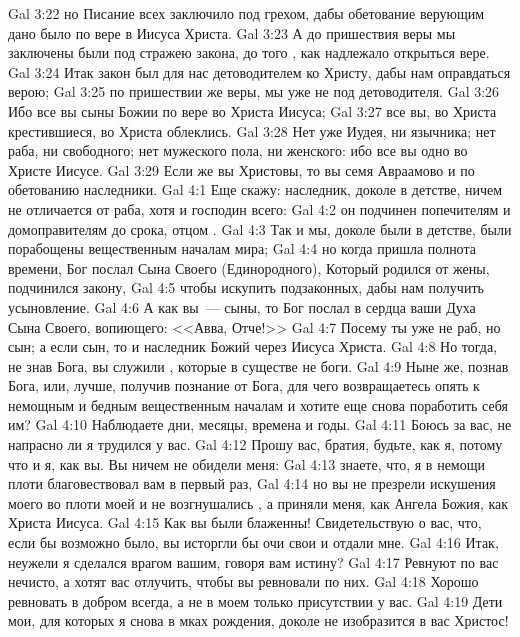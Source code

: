 \vs Gal 3:22 но Писание всех заключило под грехом, дабы обетование верующим дано было по вере в Иисуса Христа.
\vs Gal 3:23 А до пришествия веры мы заключены были под стражею закона, до того , как надлежало открыться вере.
\vs Gal 3:24 Итак закон был для нас детоводителем ко Христу, дабы нам оправдаться верою;
\vs Gal 3:25 по пришествии же веры, мы уже не под  детоводителя.
\vs Gal 3:26 Ибо все вы сыны Божии по вере во Христа Иисуса;
\vs Gal 3:27 все вы, во Христа крестившиеся, во Христа облеклись.
\vs Gal 3:28 Нет уже Иудея, ни язычника; нет раба, ни свободного; нет мужеского пола, ни женского: ибо все вы одно во Христе Иисусе.
\vs Gal 3:29 Если же вы Христовы, то вы семя Авраамово и по обетованию наследники.
\vs Gal 4:1 Еще скажу: наследник, доколе в детстве, ничем не отличается от раба, хотя и господин всего:
\vs Gal 4:2 он подчинен попечителям и домоправителям до срока, отцом .
\vs Gal 4:3 Так и мы, доколе были в детстве, были порабощены вещественным началам мира;
\vs Gal 4:4 но когда пришла полнота времени, Бог послал Сына Своего (Единородного), Который родился от жены, подчинился закону,
\vs Gal 4:5 чтобы искупить подзаконных, дабы нам получить усыновление.
\vs Gal 4:6 А как вы~--- сыны, то Бог послал в сердца ваши Духа Сына Своего, вопиющего: <<Авва, Отче!>>
\vs Gal 4:7 Посему ты уже не раб, но сын; а если сын, то и наследник Божий через Иисуса Христа.
\vs Gal 4:8 Но тогда, не знав Бога, вы служили , которые в существе не боги.
\vs Gal 4:9 Ныне же, познав Бога, или, лучше, получив познание от Бога, для чего возвращаетесь опять к немощным и бедным вещественным началам и хотите еще снова поработить себя им?
\vs Gal 4:10 Наблюдаете дни, месяцы, времена и годы.
\vs Gal 4:11 Боюсь за вас, не напрасно ли я трудился у вас.
\rsbpar\vs Gal 4:12 Прошу вас, братия, будьте, как я, потому что и я, как вы. Вы ничем не обидели меня:
\vs Gal 4:13 знаете, что,  я в немощи плоти благовествовал вам в первый раз,
\vs Gal 4:14 но вы не презрели искушения моего во плоти моей и не возгнушались , а приняли меня, как Ангела Божия, как Христа Иисуса.
\vs Gal 4:15 Как вы были блаженны! Свидетельствую о вас, что, если бы возможно было, вы исторгли бы очи свои и отдали мне.
\vs Gal 4:16 Итак, неужели я сделался врагом вашим, говоря вам истину?
\vs Gal 4:17 Ревнуют по вас нечисто, а хотят вас отлучить, чтобы вы ревновали по них.
\vs Gal 4:18 Хорошо ревновать в добром всегда, а не в моем только присутствии у вас.
\vs Gal 4:19 Дети мои, для которых я снова в мках рождения, доколе не изобразится в вас Христос!

